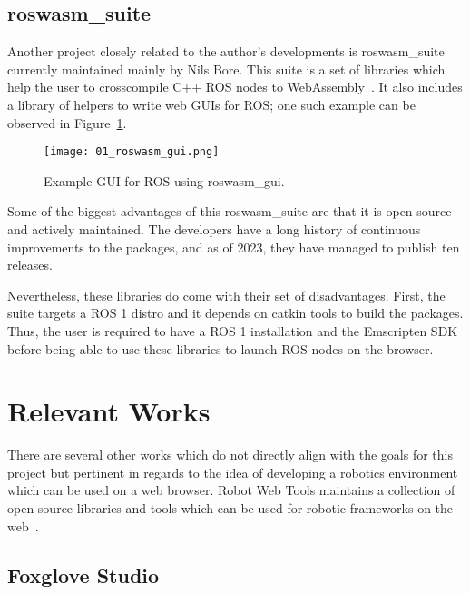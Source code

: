     \subsection{roswasm\_suite}

        Another project closely related to the author's developments is \textsf{roswasm\_suite} currently maintained mainly by Nils Bore. This suite is a set of libraries which help the user to cross\-compile C++ ROS nodes to WebAssembly~\cite{roswasmsuite}. It also includes a library of helpers to write web \ac{GUI}s for ROS; one such example can be observed in Figure~\ref{fig:roswasm_gui}.

        \begin{figure}[htbp]
            \centering
            \texttt{[image: 01\_roswasm\_gui.png]}
            \caption{Example \ac{GUI} for ROS using \textsf{roswasm\_gui}.}
            \label{fig:roswasm_gui}
        \end{figure}

        Some of the biggest advantages of this \textsf{roswasm\_suite} are that it is open source and actively maintained. The developers have a long history of continuous improvements to the packages, and as of 2023, they have managed to publish ten releases. 

        Nevertheless, these libraries do come with their set of disadvantages. First, the suite targets a \ac{ROS} 1 distro and it depends on \textsf{catkin} tools to build the packages. Thus, the user is required to have a \ac{ROS} 1 installation and the Emscripten \ac{SDK} before being able to use these libraries to launch \ac{ROS} nodes on the browser.


\section{Relevant Works}

    There are several other works which do not directly align with the goals for this project but pertinent in regards to the idea of developing a robotics environment which can be used on a web browser. Robot Web Tools maintains a collection of open source libraries and tools which can be used for robotic frameworks on the web~\cite{robotwebtools}.
    
    \subsection{Foxglove Studio}

